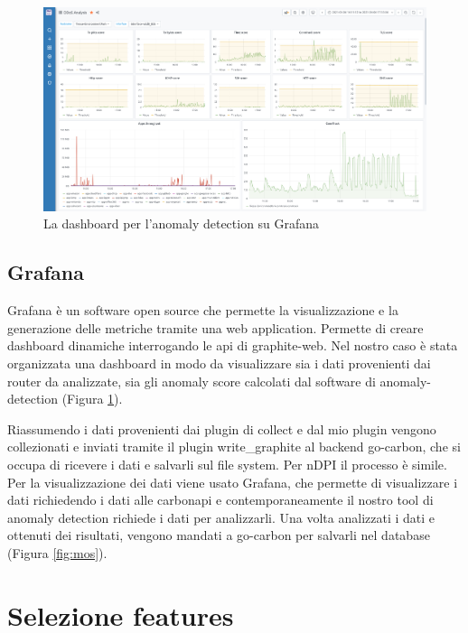 \begin{figure}[h]
    \includegraphics[width=\hsize]{images/my_work/grafana_dashboard.png}
    \caption{La dashboard per l'anomaly detection su Grafana}
    \label{fig:grafana}
    \centering
\end{figure}

\subsection{Grafana}
Grafana è un software open source che permette la visualizzazione e la generazione delle metriche tramite una web application. Permette di creare dashboard dinamiche interrogando le api di graphite-web. Nel nostro caso è stata organizzata una dashboard in modo da visualizzare sia i dati provenienti dai router da analizzate, sia gli anomaly score calcolati dal software di anomaly-detection (Figura \ref{fig:grafana}).


Riassumendo i dati provenienti dai plugin di collect e dal mio plugin vengono collezionati e inviati tramite il plugin write\_graphite al backend go-carbon, che si occupa di ricevere i dati e salvarli sul file system. Per nDPI il processo è simile. Per la visualizzazione dei dati viene usato Grafana, che permette di visualizzare i dati richiedendo i dati alle carbonapi e contemporaneamente il nostro tool di anomaly detection richiede i dati per analizzarli. Una volta analizzati i dati e ottenuti dei risultati, vengono mandati a go-carbon per salvarli nel database (Figura \ref{fig:mos}).

\section{Selezione features}

